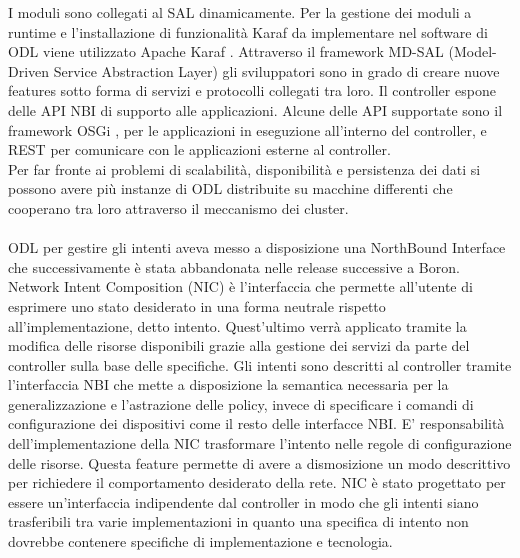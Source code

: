 I moduli sono collegati al SAL dinamicamente.
Per la gestione dei moduli a runtime e l'installazione di funzionalità Karaf da implementare nel software di ODL viene utilizzato Apache Karaf \cite{Apache}.
Attraverso il framework MD-SAL (Model-Driven Service Abstraction Layer) gli sviluppatori sono in grado di creare nuove features sotto forma di servizi e protocolli collegati tra loro.
Il controller espone delle API NBI di supporto alle applicazioni. Alcune delle API supportate sono il framework OSGi \cite{osgi}, per le applicazioni in eseguzione all'interno del controller,
e REST per comunicare con le applicazioni esterne al controller.
\\Per far fronte ai problemi di scalabilità, disponibilità e persistenza dei dati si possono avere più instanze di ODL distribuite su macchine differenti che cooperano tra loro attraverso il meccanismo dei cluster.
\\
\\ODL per gestire gli intenti aveva messo a disposizione una NorthBound Interface che successivamente è stata abbandonata nelle release successive a Boron.
\\Network Intent Composition (NIC) \cite{nic} è l'interfaccia che permette all'utente di esprimere uno stato desiderato in una forma neutrale rispetto all'implementazione, detto intento. Quest'ultimo verrà applicato tramite la modifica delle risorse disponibili 
grazie alla gestione dei servizi da parte del controller sulla base delle specifiche.
Gli intenti sono descritti al controller tramite l'interfaccia NBI che mette a disposizione la semantica necessaria per la generalizzazione e l'astrazione delle policy, invece di specificare i comandi di configurazione dei dispositivi come il resto delle interfacce NBI.
E' responsabilità dell'implementazione della NIC trasformare l'intento nelle regole di configurazione delle risorse.
Questa feature permette di avere a dismosizione un modo descrittivo per richiedere il comportamento desiderato della rete.
NIC è stato progettato per essere un'interfaccia indipendente dal controller in modo che gli intenti siano trasferibili tra varie implementazioni in quanto una specifica di intento non dovrebbe contenere specifiche di implementazione e tecnologia.



